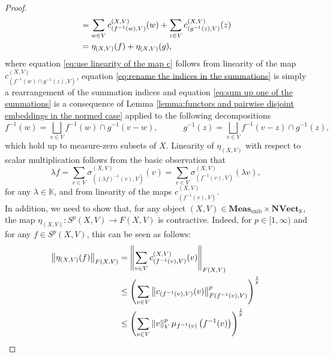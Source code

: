 \documentclass{amsart}
\theoremstyle{definition}
\theoremstyle{plain}
\newcommand{\K}{\mathbb{K}}
\newcommand{\norm}[1]{\left\lVert #1\right\rVert} %
\newcommand{\embMeas}{\mathbf{Meas}_\mathrm{emb}}
\newcommand{\NVect}{\mathbf{NVect}_{\mathbb{K}}}
\begin{document}
\begin{proof}
\begin{align}
                &= \sum_{w \in V} c_{\left( f^{-1}(w),V \right)}^{(X,V)}(w) + \sum_{z \in V} c_{\left( g^{-1}(z),V \right)}^{(X,V)}(z) \label{eq:sum up one of the summations} \\
                &= \eta_{(X,V)}(f) + \eta_{(X,V)}(g), \notag
            \end{align}
            where equation \eqref{eq:use linearity of the map c} follows from linearity of the map $c_{\left( f^{-1}(w)\cap g^{-1}(z),V \right)}^{(X,V)}$, equation \eqref{eq:rename the indices in the summations} is simply a rearrangement of the summation indices and equation \eqref{eq:sum up one of the summations} is a consequence of Lemma \ref{lemma:functors and pairwise disjoint embeddings in the normed case} applied to the following decompositions
            \begin{equation*}
                f^{-1}(w) = \bigsqcup_{v \in V} f^{-1}(w) \cap g^{-1}(v - w), \quad \qquad g^{-1}(z) = \bigsqcup_{v \in V} f^{-1}(v-z)\cap g^{-1}(z),
            \end{equation*}
            which hold up to measure-zero subsets of $X$.
            Linearity of $\eta_{(X,V)}$ with respect to scalar multiplication follows from the basic observation that 
            \begin{equation*}
                \lambda f = \sum_{v \in V} \sigma_{\left( (\lambda f)^{-1}(v),V \right)}^{(X,V)}(v) = \sum_{v \in V} \sigma_{\left( f^{-1}(v),V \right)}^{(X,V)}(\lambda v),
            \end{equation*}
            for any $\lambda \in \K$, and from linearity of the maps $c_{\left( f^{-1}(v),V \right)}^{(X,V)}$. \\
            In addition, we need to show that, for any object $(X,V) \in \embMeas \times \NVect$, the map $\eta_{(X,V)} \colon S^p(X,V) \rightarrow F(X,V)$ is contractive.
            Indeed, for $p \in [1,\infty)$ and for any $f \in S^p(X,V)$, this can be seen as follows:
            \begin{align}
                \norm{\eta_{(X,V)}(f)}_{F(X,V)} &= \norm{\sum_{v \in V} c_{\left( f^{-1}(v),V \right)}^{(X,V)}(v)}_{F(X,V)} \notag \\
                &\leq \left( \sum_{v \in V} \norm{c_{\left( f^{-1}(v),V \right)}(v)}^p_{F\left( f^{-1}(v),V \right)} \right)^{\frac{1}{p}} \label{eq:apply norm inequality wrt complementary embeddings in the normed case} \\
                &\leq \left( \sum_{v \in V} \norm{v}_V^p \mu_{f^{-1}(v)}\left( f^{-1}(v) \right) \right)^{\frac{1}{p}} \label{eq:apply axiom III} \\

\end{align}
\end{proof}
\end{document}
